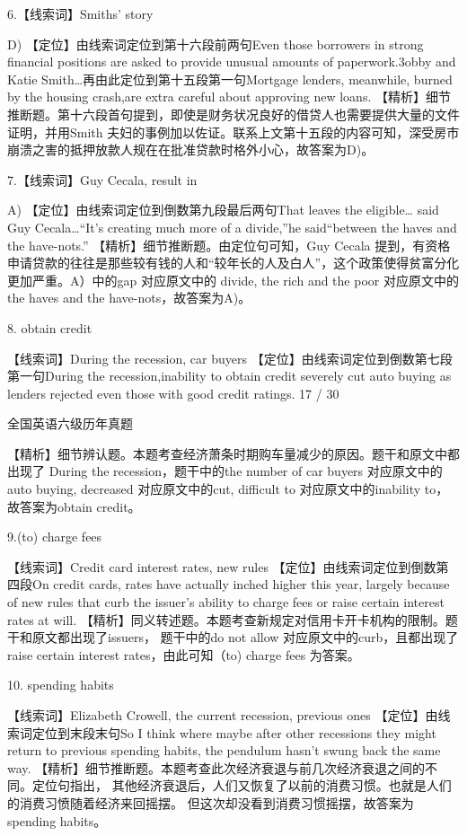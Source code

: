 \documentclass[UTF8,11pt]{ctexart}
\begin{document}
6.【线索词】Smiths' story


D) 【定位】由线索词定位到第十六段前两句Even those borrowers in strong financial positions are asked to provide unusual amounts of paperwork.3obby and Katie Smith…再由此定位到第十五段第一句Mortgage lenders, meanwhile, burned by the housing crash,are extra careful about approving new loans. 【精析】细节推断题。第十六段首句提到，即使是财务状况良好的借贷人也需要提供大量的文件证明，并用Smith 夫妇的事例加以佐证。联系上文第十五段的内容可知，深受房市崩溃之害的抵押放款人规在在批准贷款时格外小心，故答案为D)。


7.【线索词】Guy Cecala, result in


A) 【定位】由线索词定位到倒数第九段最后两句That leaves the eligible… said Guy Cecala…“It's creating much more of a divide,”he said“between the haves and the have-nots.” 【精析】细节推断题。由定位句可知，Guy Cecala 提到，有资格申请贷款的往往是那些较有钱的人和“较年长的人及白人”，这个政策使得贫富分化更加严重。A）中的gap 对应原文中的 divide, the rich and the poor 对应原文中的the haves and the have-nots，故答案为A)。


8. obtain credit


【线索词】During the recession, car buyers 【定位】由线索词定位到倒数第七段第一句During the recession,inability to obtain credit severely cut auto buying as lenders rejected even those with good credit ratings. 17 / 30


全国英语六级历年真题


【精析】细节辨认题。本题考查经济萧条时期购车量减少的原因。题干和原文中都出现了 During the recession，题干中的the number of car buyers 对应原文中的auto buying, decreased 对应原文中的cut, difficult to 对应原文中的inability to，故答案为obtain credit。


9.(to) charge fees


【线索词】Credit card interest rates, new rules 【定位】由线索词定位到倒数第四段On credit cards, rates have actually inched higher this year, largely because of new rules that curb the issuer's ability to charge fees or raise certain interest rates at will. 【精析】同义转述题。本题考查新规定对信用卡开卡机构的限制。题干和原文都出现了issuers， 题干中的do not allow 对应原文中的curb，且都出现了raise certain interest rates，由此可知（to) charge fees 为答案。


10. spending habits


【线索词】Elizabeth Crowell, the current recession, previous ones 【定位】由线索词定位到末段末句So I think where maybe after other recessions they might return to previous spending habits, the pendulum hasn't swung back the same way. 【精析】细节推断题。本题考查此次经济衰退与前几次经济衰退之间的不同。定位句指出， 其他经济衰退后，人们又恢复了以前的消费习惯。也就是人们的消费习愤随着经济来回摇摆。 但这次却没看到消费习惯摇摆，故答案为spending habits。
\end{document}
